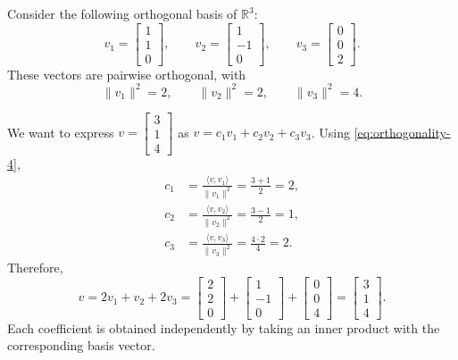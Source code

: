 \begin{example}
	Consider the following orthogonal basis of
	\(\mathbb{R}^3\):
	\[
		v_1=\begin{bmatrix}1\\1\\0\end{bmatrix},
		\qquad
		v_2=\begin{bmatrix}1\\-1\\0\end{bmatrix},
		\qquad
		v_3=\begin{bmatrix}0\\0\\2\end{bmatrix}.
	\]
	These vectors are pairwise orthogonal, with
	\[
		\|v_1\|^2=2,\qquad
		\|v_2\|^2=2,\qquad
		\|v_3\|^2=4.
	\]

	We want to express
	\(v=\begin{bmatrix}3\\1\\4\end{bmatrix}\)
	as \(v=c_1v_1+c_2v_2+c_3v_3\).
	Using \eqref{eq:orthogonality-4},
	\begin{align*}
		c_1
		 & =\frac{\langle v,v_1\rangle}{\|v_1\|^2}
		=\frac{3+1}{2}=2,                          \\
		c_2
		 & =\frac{\langle v,v_2\rangle}{\|v_2\|^2}
		=\frac{3-1}{2}=1,                          \\
		c_3
		 & =\frac{\langle v,v_3\rangle}{\|v_3\|^2}
		=\frac{4\cdot2}{4}=2.
	\end{align*}
	Therefore,
	\[
		v=2v_1+v_2+2v_3
		=\begin{bmatrix}2\\2\\0\end{bmatrix}
		+\begin{bmatrix}1\\-1\\0\end{bmatrix}
		+\begin{bmatrix}0\\0\\4\end{bmatrix}
		=\begin{bmatrix}3\\1\\4\end{bmatrix}.
	\]
	Each coefficient is obtained independently by
	taking an inner product with the corresponding
	basis vector.
\end{example}

